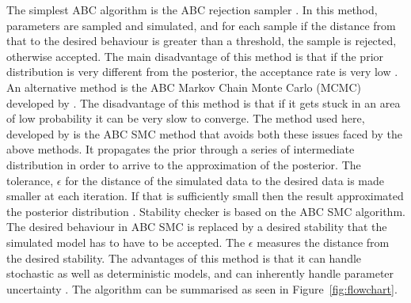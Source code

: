 The simplest ABC algorithm is the ABC rejection sampler \autocite{Pritchard:1999td}. In this method, parameters are sampled and simulated, and for each sample if the distance from that to the desired behaviour is greater than a threshold, the sample is rejected, otherwise accepted. The main disadvantage of this method is that if the prior distribution is very different from the posterior, the acceptance rate is very low \autocite{Toni:2009tr}. An alternative method is the ABC Markov Chain Monte Carlo (MCMC) developed by \textcite{Marjoram:2003up}. The disadvantage of this method is that if it gets stuck in an area of low probability it can be very slow to converge. The method used here, developed by \textcite{Toni:2009tr} is the ABC SMC method that avoids both these issues faced by the above methods. It propagates the prior through a series of intermediate distribution in order to arrive to the approximation of the posterior. The tolerance, $\epsilon$ for the distance of the simulated data to the desired data is made smaller at each iteration. If that is sufficiently small then the result approximated the posterior distribution \autocite{Toni:2009tr}. 
Stability checker is based on the ABC SMC algorithm. The desired behaviour in ABC SMC is replaced by a desired stability that the simulated model has to have to be accepted. The $\epsilon$ measures the distance from the desired stability. The advantages of this method is that it can handle stochastic as well as deterministic models, and can inherently handle parameter uncertainty \autocite{Barnes:2011hh}. The algorithm can be summarised as seen in Figure~\ref{fig:flowchart}.

